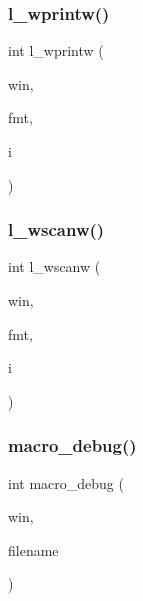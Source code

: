 \mbox{\label{C-macros_8c_af6c94cd0fe4d153ee0b562bc2140c84a}} 
\subsubsection{\texorpdfstring{l\+\_\+wprintw()}{l\_wprintw()}}
{\footnotesize\ttfamily int l\+\_\+wprintw (\begin{DoxyParamCaption}\item[{W\+I\+N\+D\+OW $\ast$}]{win,  }\item[{const char $\ast$}]{fmt,  }\item[{long}]{i }\end{DoxyParamCaption})}

\mbox{\label{C-macros_8c_ae2aa5264dfbd2042fa25e8e70bb445fe}} 
\subsubsection{\texorpdfstring{l\+\_\+wscanw()}{l\_wscanw()}}
{\footnotesize\ttfamily int l\+\_\+wscanw (\begin{DoxyParamCaption}\item[{W\+I\+N\+D\+OW $\ast$}]{win,  }\item[{char $\ast$}]{fmt,  }\item[{long $\ast$}]{i }\end{DoxyParamCaption})}

\mbox{\label{C-macros_8c_ad39de37428ca946dfb31dbcf70b74b74}} 
\subsubsection{\texorpdfstring{macro\+\_\+debug()}{macro\_debug()}}
{\footnotesize\ttfamily int macro\+\_\+debug (\begin{DoxyParamCaption}\item[{W\+I\+N\+D\+OW $\ast$}]{win,  }\item[{const char $\ast$}]{filename }\end{DoxyParamCaption})}


